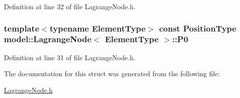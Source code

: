 Definition at line 32 of file Lagrange\+Node.\+h.

\hypertarget{structmodel_1_1_lagrange_node_a7bc278747778ccac328ea854fb85bf31}{}
\subsubsection[{P0}]{\setlength{\rightskip}{0pt plus 5cm}template$<$typename Element\+Type$>$ const {\bf Position\+Type} {\bf model\+::\+Lagrange\+Node}$<$ Element\+Type $>$\+::P0}\label{structmodel_1_1_lagrange_node_a7bc278747778ccac328ea854fb85bf31}


Definition at line 31 of file Lagrange\+Node.\+h.



The documentation for this struct was generated from the following file\+:\begin{DoxyCompactItemize}
\item 
\hyperlink{_lagrange_node_8h}{Lagrange\+Node.\+h}\end{DoxyCompactItemize}
